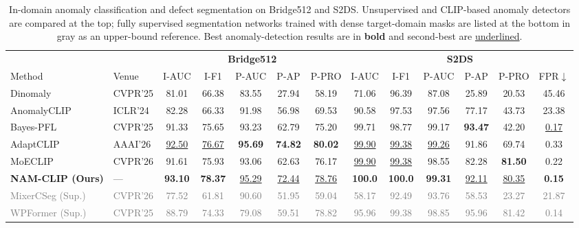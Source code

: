 \documentclass[conference]{IEEEtran}
\newcommand{\method}{NAM-CLIP}
\begin{document}
\begin{table}[t]
\centering
\caption{In-domain anomaly classification and defect segmentation on Bridge512 and S2DS. Unsupervised and CLIP-based anomaly detectors are compared at the top; fully supervised segmentation networks trained with dense target-domain masks are listed at the bottom in gray as an upper-bound reference. Best anomaly-detection results are in \textbf{bold} and second-best are \underline{underlined}.}
\label{tab:in_domain}
\footnotesize
\setlength{\tabcolsep}{5.5pt}
\begin{tabular}{l l ccccc cccccc}
\toprule
& & \multicolumn{5}{c}{\textbf{Bridge512}} & \multicolumn{6}{c}{\textbf{S2DS}} \\
\cmidrule(lr){3-7} \cmidrule(lr){8-13}
Method & Venue & I-AUC & I-F1 & P-AUC & P-AP & P-PRO & I-AUC & I-F1 & P-AUC & P-AP & P-PRO & FPR$\downarrow$ \\
\midrule
Dinomaly~\cite{guo2025dinomaly} & CVPR'25 & 81.01 & 66.38 & 83.55 & 27.94 & 58.19 & 71.06 & 96.39 & 87.08 & 25.89 & 20.53 & 45.46 \\
AnomalyCLIP~\cite{zhou2024anomalyclip} & ICLR'24 & 82.28 & 66.33 & 91.98 & 56.98 & 69.53 & 90.58 & 97.53 & 97.56 & 77.17 & 43.73 & 23.38 \\
Bayes-PFL~\cite{qu2025bayespfl} & CVPR'25 & 91.33 & 75.65 & 93.23 & 62.79 & 75.20 & 99.71 & 98.77 & 99.17 & \textbf{93.47} & 42.20 & \underline{0.17} \\
AdaptCLIP~\cite{gao2026adaptclip} & AAAI'26 & \underline{92.50} & \underline{76.67} & \textbf{95.69} & \textbf{74.82} & \textbf{80.02} & \underline{99.90} & \underline{99.38} & \underline{99.26} & 91.86 & 69.74 & 0.33 \\
MoECLIP~\cite{park2026moeclip} & CVPR'26 & 91.61 & 75.93 & 93.06 & 62.63 & 76.17 & \underline{99.90} & \underline{99.38} & 98.55 & 82.28 & \textbf{81.50} & 0.22 \\
\textbf{\method{} (Ours)} & --- & \textbf{93.10} & \textbf{78.37} & \underline{95.29} & \underline{72.44} & \underline{78.76} & \textbf{100.0} & \textbf{100.0} & \textbf{99.31} & \underline{92.11} & \underline{80.35} & \textbf{0.15} \\
\midrule
\textcolor{gray}{MixerCSeg (Sup.)~\cite{zhao2026mixercseg}} & \textcolor{gray}{CVPR'26} & \textcolor{gray}{77.52} & \textcolor{gray}{61.81} & \textcolor{gray}{90.60} & \textcolor{gray}{51.95} & \textcolor{gray}{59.04} & \textcolor{gray}{58.17} & \textcolor{gray}{92.49} & \textcolor{gray}{93.76} & \textcolor{gray}{58.53} & \textcolor{gray}{23.27} & \textcolor{gray}{21.87} \\
\textcolor{gray}{WPFormer (Sup.)~\cite{yan2025wpformer}} & \textcolor{gray}{CVPR'25} & \textcolor{gray}{88.79} & \textcolor{gray}{74.33} & \textcolor{gray}{79.08} & \textcolor{gray}{59.51} & \textcolor{gray}{78.82} & \textcolor{gray}{95.96} & \textcolor{gray}{99.38} & \textcolor{gray}{98.85} & \textcolor{gray}{95.96} & \textcolor{gray}{81.42} & \textcolor{gray}{0.14} \\
\bottomrule
\end{tabular}
\end{table}
\end{document}
